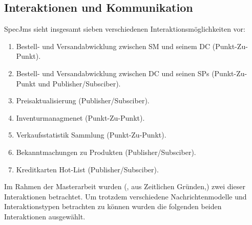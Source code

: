 \subsection{Interaktionen und Kommunikation}
SpecJms sieht insgesamt sieben verschiedenen Interaktionsmöglichkeiten vor: 
\begin{enumerate}
    \item Bestell- und Versandabwicklung zwischen SM und seinem DC (Punkt-Zu-Punkt).
    \item Bestell- und Versandabwicklung zwischen DC und seinen SPs (Punkt-Zu-Punkt und Publisher/Subsciber).
    \item Preisaktualisierung (Publisher/Subsciber).
    \item Inventurmanagmenet (Punkt-Zu-Punkt).
    \item Verkaufsstatistik Sammlung (Punkt-Zu-Punkt).
    \item Bekanntmachungen zu Produkten (Publisher/Subsciber).
    \item Kreditkarten Hot-List (Publisher/Subsciber).
    
\end{enumerate}
Im Rahmen der Masterarbeit wurden (, aus Zeitlichen Gründen,) zwei dieser Interaktionen betrachtet. Um trotzdem verschiedene Nachrichtenmodelle und Interaktionstypen betrachten zu können wurden die folgenden beiden Interaktionen ausgewählt.
